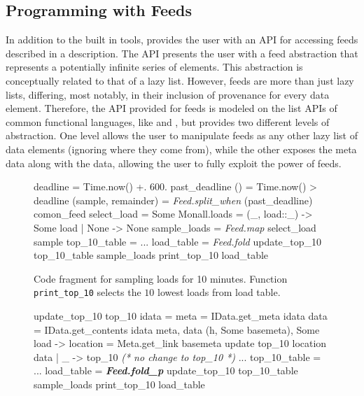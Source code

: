 

\subsection{Programming with Feeds}

In addition to the built in tools, \padsd{} provides the user with an API for accessing feeds described in a description. The API presents the user with a feed abstraction that represents a potentially infinite series of elements. This abstraction is conceptually related to that of a lazy list. However, feeds are more than just lazy lists, differing, most notably, in their inclusion of provenance for every data element. Therefore, the API provided for feeds is modeled on the list APIs of common functional languages, like \ocaml and \haskell, but provides two different levels of abstraction. One level allows the user to manipulate feeds as any other lazy list of data elements (ignoring where they come from), while the other exposes the meta data along with the data, allowing the user to fully exploit the power of feeds.


\begin{figure}[tb]
\centering
\begin{codebox}
 deadline = Time.now() +. 600. 
 past_deadline () = Time.now() > deadline 
 (sample, remainder) = 
   \textit{Feed.split_when} (past_deadline) comon_feed 
 select_load = 
    Some {Monall.loads = (_, load::_)} -> Some load
  | None -> None 
 sample_loads = \textit{Feed.map} select_load sample 
 top_10_table = ... 
 load_table = \textit{Feed.fold} update_top_10 
   top_10_table sample_loads 
 print_top_10 load_table
\end{codebox}
  \caption{Code fragment for sampling \planetlab loads for 10 minutes. Function \texttt{print\_top\_10} selects the $10$ lowest loads from load table.}
\label{fig:sample-loads}
\end{figure}

\begin{figure}[tb]
\centering
\begin{codebox}
 update_top_10 top_10 idata =
   meta = IData.get_meta idata 
   data = IData.get_contents idata 
   meta, data  
    (h, Some basemeta), Some load ->
       location = Meta.get_link basemeta 
      update top_10 location data
  | _ -> top_10 \textit{ (* no change to top_10 *)}
   ...
 top_10_table = ... 
 load_table = \textit{\textbf{Feed.fold_p}} update_top_10 
   top_10_table sample_loads
 print_top_10 load_table
\end{codebox}
  \caption{}
\label{fig:sample-loads-prov}
\end{figure}

